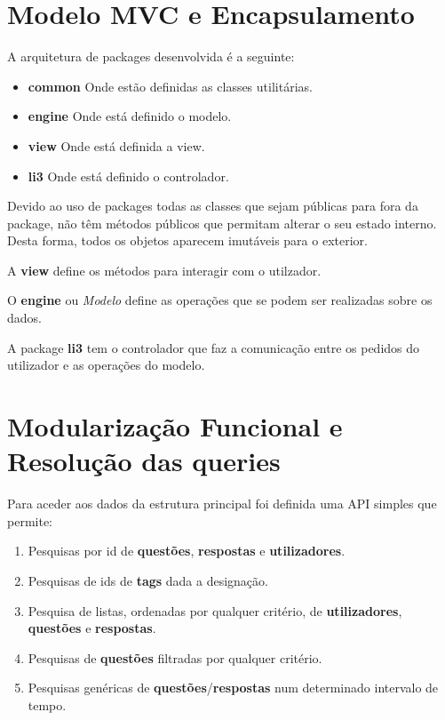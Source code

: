 \documentclass[10pt,a4paper]{report}
\begin{document}
\chapter{Modelo MVC e Encapsulamento}
    A arquitetura de packages desenvolvida é a seguinte:
    \begin{itemize}
        \item \textbf{common} Onde estão definidas as classes utilitárias.
        \item \textbf{engine} Onde está definido o modelo.
        \item \textbf{view} Onde está definida a view.
        \item \textbf{li3} Onde está definido o controlador.
    \end{itemize}
    Devido ao uso de packages todas as classes que sejam públicas para fora da
    package, não têm métodos públicos que permitam alterar o seu estado interno.
    Desta forma, todos os objetos aparecem imutáveis para o exterior.

    A \textbf{view} define os métodos para interagir com o utilzador.

    O \textbf{engine} ou \textit{Modelo} define as operações que se podem
    ser realizadas sobre os dados.
    
    A package \textbf{li3} tem o controlador que faz a comunicação entre os
    pedidos do utilizador e as operações do modelo.

\chapter{Modularização Funcional e Resolução das queries}
    Para aceder aos dados da estrutura principal foi definida uma API
    simples que permite:
    \begin{enumerate}[1.]
        \item Pesquisas por id de \textbf{questões}, \textbf{respostas} e
        \textbf{utilizadores}.
        \item Pesquisas de ids de \textbf{tags} dada a designação.
        \item Pesquisa de listas, ordenadas por qualquer critério, de
        \textbf{utilizadores}, \textbf{questões} e \textbf{respostas}.
        \item Pesquisas de \textbf{questões} filtradas por qualquer critério.
        \item Pesquisas genéricas de \textbf{questões}/\textbf{respostas}
        num determinado intervalo de tempo.
    \end{enumerate}
\end{document}
